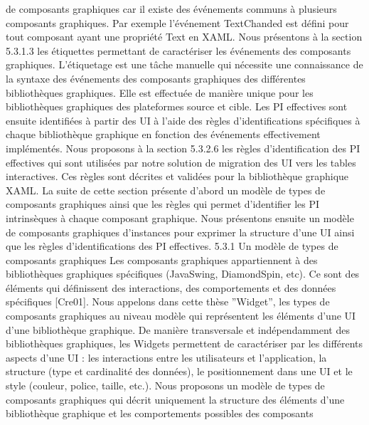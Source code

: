 \documentclass{article}
\begin{document}
de composants graphiques car il existe des \'{e}v\'{e}nements communs \`{a} plusieurs composants graphiques.
Par exemple l’\'{e}v\'{e}nement TextChanded est d\'{e}ﬁni pour tout composant ayant une propri\'{e}t\'{e} Text en
XAML. Nous pr\'{e}sentons \`{a} la section 5.3.1.3 les \'{e}tiquettes permettant de caract\'{e}riser les \'{e}v\'{e}nements
des composants graphiques. L’\'{e}tiquetage est une t\^{a}che manuelle qui n\'{e}cessite une connaissance de la
syntaxe des \'{e}v\'{e}nements des composants graphiques des diff\'{e}rentes biblioth\`{e}ques graphiques. Elle est
effectu\'{e}e de mani\`{e}re unique pour les biblioth\`{e}ques graphiques des plateformes source et cible.
Les PI effectives sont ensuite identiﬁ\'{e}es \`{a} partir des UI \`{a} l’aide des r\`{e}gles d’identiﬁcations sp\'{e}ciﬁques \`{a} chaque biblioth\`{e}que graphique en fonction des \'{e}v\'{e}nements effectivement impl\'{e}ment\'{e}s. Nous
proposons \`{a} la section 5.3.2.6 les r\`{e}gles d’identiﬁcation des PI effectives qui sont utilis\'{e}es par notre
solution de migration des UI vers les tables interactives. Ces r\`{e}gles sont d\'{e}crites et valid\'{e}es pour la
biblioth\`{e}que graphique XAML.
La suite de cette section pr\'{e}sente d’abord un mod\`{e}le de types de composants graphiques ainsi que
les r\`{e}gles qui permet d’identiﬁer les PI intrins\`{e}ques \`{a} chaque composant graphique. Nous pr\'{e}sentons
ensuite un mod\`{e}le de composants graphiques d’instances pour exprimer la structure d’une UI ainsi
que les r\`{e}gles d’identiﬁcations des PI effectives.
5.3.1
Un mod\`{e}le de types de composants graphiques
Les composants graphiques appartiennent \`{a} des biblioth\`{e}ques graphiques sp\'{e}ciﬁques (JavaSwing,
DiamondSpin, etc). Ce sont des \'{e}l\'{e}ments qui d\'{e}ﬁnissent des interactions, des comportements et des
donn\'{e}es sp\'{e}ciﬁques [Cre01]. Nous appelons dans cette th\`{e}se ”Widget”, les types de composants graphiques au niveau mod\`{e}le qui repr\'{e}sentent les \'{e}l\'{e}ments d’une UI d’une biblioth\`{e}que graphique.
De mani\`{e}re transversale et ind\'{e}pendamment des biblioth\`{e}ques graphiques, les Widgets permettent
de caract\'{e}riser par les diff\'{e}rents aspects d’une UI : les interactions entre les utilisateurs et l’application,
la structure (type et cardinalit\'{e} des donn\'{e}es), le positionnement dans une UI et le style (couleur, police,
taille, etc.). Nous proposons un mod\`{e}le de types de composants graphiques qui d\'{e}crit uniquement la
structure des \'{e}l\'{e}ments d’une biblioth\`{e}que graphique et les comportements possibles des composants
\end{document}
